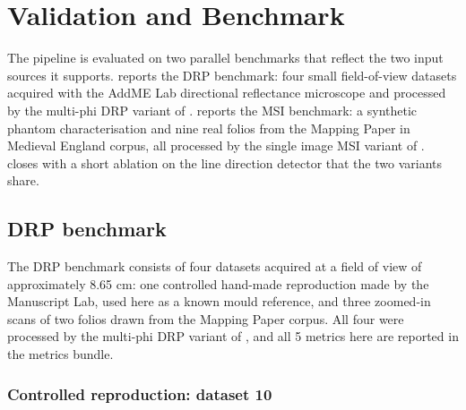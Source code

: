 \section{Validation and Benchmark}
\label{sec:benchmark}

The pipeline is evaluated on two parallel benchmarks that reflect
the two input sources it supports.
 reports the DRP benchmark: four small
field-of-view datasets acquired with the AddME Lab directional
reflectance microscope and processed by the multi-phi DRP variant
of .  reports
the MSI benchmark: a synthetic phantom characterisation and nine
real folios from the Mapping Paper in Medieval England corpus,
all processed by the single image MSI variant of
.  closes
with a short ablation on the line direction detector that the
two variants share.


\subsection{DRP benchmark}
\label{sec:benchmark:drp}

The DRP benchmark consists of four datasets acquired at a field
of view of approximately 8.65 cm: one controlled hand-made
reproduction made by the Manuscript Lab, used here as a known mould
reference, and three zoomed-in scans of two folios drawn from the
Mapping Paper corpus. All four were processed by the multi-phi DRP
variant of , and all 5 metrics here are reported
in the metrics bundle.


\subsubsection{Controlled reproduction: dataset 10}
\label{sec:benchmark:drp:darold}

